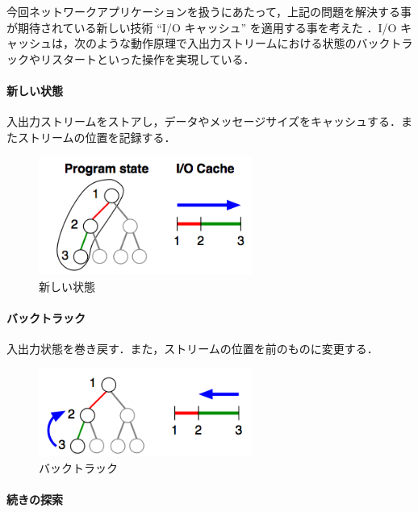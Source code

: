 \documentclass[a4j,12pt]{jarticle}
\begin{document}
今回ネットワークアプリケーションを扱うにあたって，上記の問題を解決する事が期待されている新しい技術 ``I/O キャッシュ'' を適用する事を考えた \cite{DBLP:conf/kbse/ArthoLHTY09} ．I/O キャッシュは，次のような動作原理で入出力ストリームにおける状態のバックトラックやリスタートといった操作を実現している．

\paragraph{新しい状態}

入出力ストリームをストアし，データやメッセージサイズをキャッシュする．またストリームの位置を記録する．

\begin{figure}[here]
\centering
\includegraphics[width=7cm]{images/fig6a.png}
\caption{新しい状態 \cite{DBLP:conf/rv/Artho10}}
\label{figure:fig6a}
\end{figure}


\paragraph{バックトラック}

入出力状態を巻き戻す．また，ストリームの位置を前のものに変更する．

\begin{figure}[here]
\centering
\includegraphics[width=7cm]{images/fig6b.png}
\caption{バックトラック \cite{DBLP:conf/rv/Artho10}}
\label{figure:fig6b}
\end{figure}

\newpage

\paragraph{続きの探索}
\end{document}
